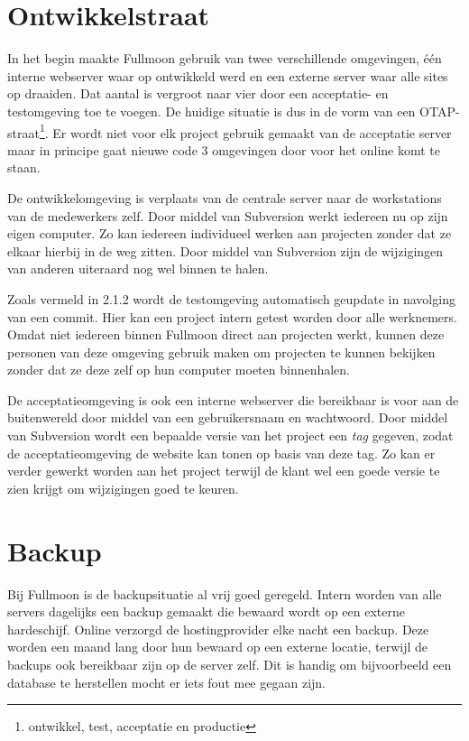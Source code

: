 \section{Ontwikkelstraat}

In het begin maakte Fullmoon gebruik van twee verschillende omgevingen, één interne webserver waar op ontwikkeld werd en een externe server waar alle sites op draaiden. Dat aantal is vergroot naar vier door een acceptatie- en testomgeving toe te voegen. De huidige situatie is dus in de vorm van een OTAP-straat\footnote{ontwikkel, test, acceptatie en productie}. Er wordt niet voor elk project gebruik gemaakt van de acceptatie server maar in principe gaat nieuwe code 3 omgevingen door voor het online komt te staan.

De ontwikkelomgeving is verplaats van de centrale server naar de workstations van de medewerkers zelf. Door middel van Subversion werkt iedereen nu op zijn eigen computer. Zo kan iedereen individueel werken aan projecten zonder dat ze elkaar hierbij in de weg zitten. Door middel van Subversion zijn de wijzigingen van anderen uiteraard nog wel binnen te halen.

Zoals vermeld in 2.1.2 wordt de testomgeving automatisch geupdate in navolging van een commit. Hier kan een project intern getest worden door alle werknemers. Omdat niet iedereen binnen Fullmoon direct aan projecten werkt, kunnen deze personen van deze omgeving gebruik maken om projecten te kunnen bekijken zonder dat ze deze zelf op hun computer moeten binnenhalen.

De acceptatieomgeving is ook een interne webserver die bereikbaar is voor aan de buitenwereld door middel van een gebruikersnaam en wachtwoord. Door middel van Subversion wordt een bepaalde versie van het project een \emph{tag} gegeven, zodat de acceptatieomgeving de website kan tonen op basis van deze tag. Zo kan er verder gewerkt worden aan het project terwijl de klant wel een goede versie te zien krijgt om wijzigingen goed te keuren.

\section{Backup}

Bij Fullmoon is de backupsituatie al vrij goed geregeld. Intern worden van alle servers dagelijks een backup gemaakt die bewaard wordt op een externe hardeschijf. Online verzorgd de hostingprovider elke nacht een backup. Deze worden een maand lang door hun bewaard op een externe locatie, terwijl de backups ook bereikbaar zijn op de server zelf. Dit is handig om bijvoorbeeld een database te herstellen mocht er iets fout mee gegaan zijn.

